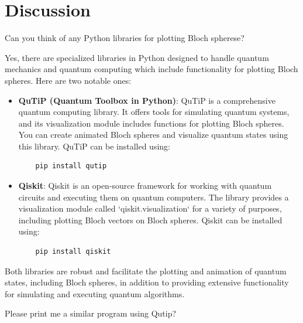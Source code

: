 \section{Discussion}

\begin{ai}
Can you think of any Python libraries for plotting Bloch spherese?
\end{ai}

\begin{airesult}
Yes, there are specialized libraries in Python designed to handle quantum mechanics and quantum
computing which include functionality for plotting Bloch spheres. Here are two notable ones:

\begin{itemize}
  \item \textbf{QuTiP (Quantum Toolbox in Python)}: QuTiP is a comprehensive quantum computing
library. It offers tools for simulating quantum systems, and its visualization module includes
functions for plotting Bloch spheres. You can create animated Bloch spheres and visualize quantum
states using this library.
    \vsp
    QuTiP can be installed using:
    \begin{verbatim}
    pip install qutip
    \end{verbatim}

  \item \textbf{Qiskit}: Qiskit is an open-source framework for working with quantum circuits and
executing them on quantum computers. The library provides a visualization module called
`qiskit.visualization` for a variety of purposes, including plotting Bloch vectors on Bloch spheres.
    \vsp
    Qiskit can be installed using:
    \begin{verbatim}
    pip install qiskit
    \end{verbatim}

  \vsp
\end{itemize}

Both libraries are robust and facilitate the plotting and animation of quantum states, including
Bloch spheres, in addition to providing extensive functionality for simulating and executing quantum
algorithms.
\end{airesult}


\begin{ai}
Please print me a similar program using Qutip?
\end{ai}

